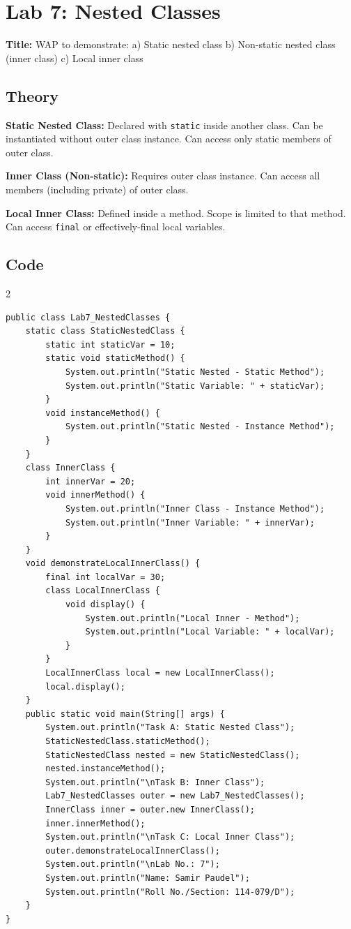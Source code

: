 \documentclass[10pt,a4paper]{article}
\begin{document}
\newpage
\section*{Lab 7: Nested Classes}

\textbf{Title:} WAP to demonstrate: a) Static nested class b) Non-static nested class (inner class) c) Local inner class

\subsection*{Theory}
\textbf{Static Nested Class:} Declared with \texttt{static} inside another class. Can be instantiated without outer class instance. Can access only static members of outer class.

\textbf{Inner Class (Non-static):} Requires outer class instance. Can access all members (including private) of outer class.

\textbf{Local Inner Class:} Defined inside a method. Scope is limited to that method. Can access \texttt{final} or effectively-final local variables.

\subsection*{Code}
\begin{multicols}{2}
\begin{lstlisting}
public class Lab7_NestedClasses {
    static class StaticNestedClass {
        static int staticVar = 10;
        static void staticMethod() {
            System.out.println("Static Nested - Static Method");
            System.out.println("Static Variable: " + staticVar);
        }
        void instanceMethod() {
            System.out.println("Static Nested - Instance Method");
        }
    }
    class InnerClass {
        int innerVar = 20;
        void innerMethod() {
            System.out.println("Inner Class - Instance Method");
            System.out.println("Inner Variable: " + innerVar);
        }
    }
    void demonstrateLocalInnerClass() {
        final int localVar = 30;
        class LocalInnerClass {
            void display() {
                System.out.println("Local Inner - Method");
                System.out.println("Local Variable: " + localVar);
            }
        }
        LocalInnerClass local = new LocalInnerClass();
        local.display();
    }
    public static void main(String[] args) {
        System.out.println("Task A: Static Nested Class");
        StaticNestedClass.staticMethod();
        StaticNestedClass nested = new StaticNestedClass();
        nested.instanceMethod();
        System.out.println("\nTask B: Inner Class");
        Lab7_NestedClasses outer = new Lab7_NestedClasses();
        InnerClass inner = outer.new InnerClass();
        inner.innerMethod();
        System.out.println("\nTask C: Local Inner Class");
        outer.demonstrateLocalInnerClass();
        System.out.println("\nLab No.: 7");
        System.out.println("Name: Samir Paudel");
        System.out.println("Roll No./Section: 114-079/D");
    }
}
\end{lstlisting}
\end{multicols}
\end{document}
